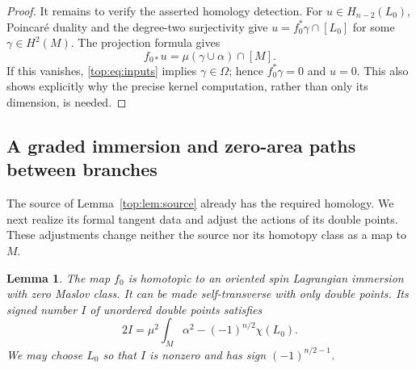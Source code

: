 \documentclass[11pt]{article}
\numberwithin{equation}{section}
\newtheorem{lemma}[theorem]{Lemma}
\theoremstyle{definition}
\theoremstyle{remark}
\begin{document}
\begin{proof}
It remains to verify the asserted homology detection.  For
$u\in H_{n-2}(L_0)$, Poincar\'e duality and the degree-two surjectivity
give $u=f_0^*\gamma\cap[L_0]$ for some $\gamma\in H^2(M)$.  The
projection formula gives
\[
       f_{0*}u=\mu(\gamma\cup\alpha)\cap[M].
\]
If this vanishes, \eqref{top:eq:inputs} implies $\gamma\in\Omega$;
hence $f_0^*\gamma=0$ and $u=0$.  This also shows explicitly why the
precise kernel computation, rather than only its dimension, is needed.
\end{proof}

\subsection{A graded immersion and zero-area paths between branches}

The source of Lemma~\ref{top:lem:source} already has the required
homology.  We next realize its formal tangent data and adjust the
actions of its double points.  These adjustments change neither the
source nor its homotopy class as a map to $M$.

\begin{lemma}\label{top:lem:initial-immersion}
The map $f_0$ is homotopic to an oriented spin Lagrangian immersion with
zero Maslov class.  It can be made self-transverse with only double
points.  Its signed number $I$ of unordered double points satisfies
\begin{equation}\label{top:eq:double-count}
       2I=\mu^2\int_M\alpha^2-(-1)^{n/2}\chi(L_0).
\end{equation}
We may choose $L_0$ so that $I$ is nonzero and has sign
$(-1)^{n/2-1}$.
\end{lemma}
\end{document}
